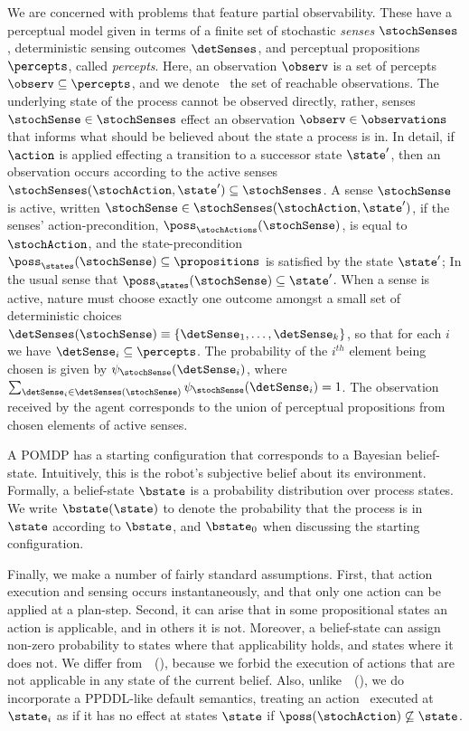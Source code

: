 We are concerned with problems that feature partial
observability. These have a perceptual model given in terms of a
finite set of stochastic {\em senses} $\stochSenses$, deterministic
sensing outcomes $\detSenses$, and perceptual propositions
$\percepts$, called {\em percepts}. Here, an observation $\observ$ is
a set of percepts $\observ \subseteq \percepts$, and we denote
\observations\ the set of reachable observations. The underlying state
of the process cannot be observed directly, rather, senses
$\stochSense \in \stochSenses$ effect an observation $\observ \in
\observations$ that informs what should be believed about the state a
process is in. In detail, if $\action$ is applied effecting a
transition to a successor state $\state'$, then an observation occurs
according to the active senses $\stochSenses(\stochAction, \state')
\subseteq \stochSenses$. A sense $\stochSense$ is active, written
$\stochSense \in \stochSenses(\stochAction, \state')$, if the senses'
action-precondition, $\poss_\stochActions(\stochSense)$, is equal to
$\stochAction$, and the state-precondition $\poss_\states(\stochSense)
\subseteq \propositions$ is satisfied by the state $\state'$; In the
usual sense that $\poss_\states(\stochSense) \subseteq \state'$.
When a sense is active, nature must choose exactly one outcome amongst
a small set of deterministic choices $\detSenses(\stochSense)
\equiv \{\detSense_1, \ldots, \detSense_k \}$, so that for each
$i$ we have $\detSense_i \subseteq \percepts$. The probability of
the $i^{th}$ element being chosen is given by
$\psi_{\stochSense}(\detSense_i)$, where $\sum_{\detSense_i \in
\detSenses(\stochSense)} \psi_{\stochSense}(\detSense_i) =
1$. The observation received by the agent corresponds to the union of
perceptual propositions from chosen elements of active senses.

A POMDP has a starting configuration that corresponds to a Bayesian
belief-state. Intuitively, this is the robot's subjective belief about
its environment. Formally, a belief-state $\bstate$ is a probability
distribution over process states. We write $\bstate(\state)$ to denote
the probability that the process is in $\state$ according to
$\bstate$, and $\bstate_0$ when discussing the starting
configuration. 

Finally, we make a number of fairly standard assumptions. First, that
action execution and sensing occurs instantaneously, and that only one
action can be applied at a plan-step. Second, it can arise that in
some propositional states an action is applicable, and in others it is
not. Moreover, a belief-state can assign non-zero probability to
states where that applicability holds, and states where it does
not. We differ
from~\citeauthor{younes:littman:04}~(\citeyear{younes:littman:04}),
because we forbid the execution of actions that are not applicable in
any state of the current belief.  Also,
unlike~\citeauthor{hoffmann:brafman:2006}~(\citeyear{hoffmann:brafman:2006}),
we do incorporate a PPDDL-like default semantics, treating an action
\stochAction\ executed at $\state_i$ as if it has no effect at
states $\state$ if $\poss(\stochAction) \not\subseteq
\state$.


